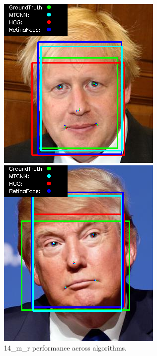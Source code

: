 \documentclass{l4proj}
\begin{document}
\begin{appendices}
\begin{figure}[h!]
  \centering
  \begin{minipage}{0.49\textwidth}
    \centering
     \includegraphics[width=\textwidth]{images/appendix/14.png}
    \caption{14\_m\_r performance across algorithms.}
    \label{whoopi_result}
  \end{minipage}
    \hfill
    \begin{minipage}{0.49\textwidth}
    \centering
     \includegraphics[width=\textwidth]{images/appendix/15.png}

\end{minipage}
\end{figure}
\end{appendices}
\end{document}
